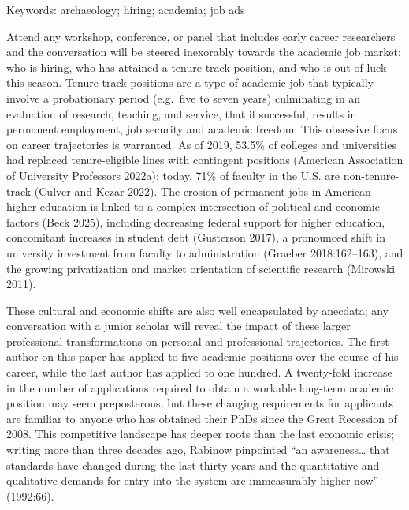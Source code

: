 \documentclass[
  12pt,
]{article}
\begin{document}
Keywords: archaeology; hiring; academia; job ads

Attend any workshop, conference, or panel that includes early career
researchers and the conversation will be steered inexorably towards the
academic job market: who is hiring, who has attained a tenure-track
position, and who is out of luck this season. Tenure-track positions are
a type of academic job that typically involve a probationary period
(e.g.~five to seven years) culminating in an evaluation of research,
teaching, and service, that if successful, results in permanent
employment, job security and academic freedom. This obsessive focus on
career trajectories is warranted. As of 2019, 53.5\% of colleges and
universities had replaced tenure-eligible lines with contingent
positions (American Association of University Professors 2022a); today,
71\% of faculty in the U.S. are non-tenure-track (Culver and Kezar
2022). The erosion of permanent jobs in American higher education is
linked to a complex intersection of political and economic factors (Beck
2025), including decreasing federal support for higher education,
concomitant increases in student debt (Gusterson 2017), a pronounced
shift in university investment from faculty to administration (Graeber
2018:162--163), and the growing privatization and market orientation of
scientific research (Mirowski 2011).

These cultural and economic shifts are also well encapsulated by
anecdata; any conversation with a junior scholar will reveal the impact
of these larger professional transformations on personal and
professional trajectories. The first author on this paper has applied to
five academic positions over the course of his career, while the last
author has applied to one hundred. A twenty-fold increase in the number
of applications required to obtain a workable long-term academic
position may seem preposterous, but these changing requirements for
applicants are familiar to anyone who has obtained their PhDs since the
Great Recession of 2008. This competitive landscape has deeper roots
than the last economic crisis; writing more than three decades ago,
Rabinow pinpointed ``an awareness\ldots{} that standards have changed
during the last thirty years and the quantitative and qualitative
demands for entry into the system are immeasurably higher now''
(1992:66).
\end{document}
